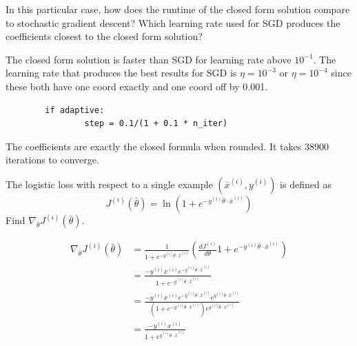 \documentclass[12pt, letterpaper]{article}
\begin{document}
\begin{subproblem}{}
    In this particular case, how does the runtime of the closed form solution compare to stochastic
gradient descent? Which learning rate used for SGD produces the coefficients closest to the closed form
solution?
\end{subproblem}
\begin{solution}
    The closed form solution is faster than SGD for learning rate above $10^{-1}$. The learning rate
    that produces the best results for SGD is $\eta = 10^{-3}$ or $\eta = 10^{-4}$ since these both have one coord exactly and one coord off by 0.001.
\end{solution}

\begin{subproblem}{}
    
\end{subproblem}
\begin{solution}
    \begin{verbatim}
        if adaptive:
                step = 0.1/(1 + 0.1 * n_iter)
    \end{verbatim}
    The coefficients are exactly the closed formula when rounded. It takes 38900 iterations to converge.
\end{solution}

\begin{subproblem}{}
    The logistic loss with respect to a single example $(\bar{x}^{(i)}, y^{(i)})$ is defined as
    \[J^{(i)}(\bar{\theta}) = \ln(1+e^{-y^{(i)}\bar{\theta}\cdot \bar{x}^{(i)}})\]
    Find $\nabla_{\bar{\theta}} J^{(i)}(\bar{\theta})$.
\end{subproblem}
\begin{solution}
    \begin{align*}
        \nabla_{\bar{\theta}} J^{(i)}(\bar{\theta}) &= \frac{1}{1+e^{-y^{(i)}\bar{\theta}\cdot \bar{x}^{(i)}}}\left( \frac{d J^{(i)}}{d \theta} 1+e^{-y^{(i)}\bar{\theta}\cdot \bar{x}^{(i)}} \right)\\
                                                    &= \frac{-y^{(i)}x^{(i)}e^{-y^{(i)}\bar{\theta}\cdot \bar{x}^{(i)}}}{1+e^{-y^{(i)}\bar{\theta}\cdot \bar{x}^{(i)}}}\\
                                                    &= \frac{-y^{(i)}x^{(i)}e^{-y^{(i)}\bar{\theta}\cdot \bar{x}^{(i)}} e^{y^{(i)}\bar{\theta}\cdot \bar{x}^{(i)}}}{\left( 1+e^{-y^{(i)}\bar{\theta}\cdot \bar{x}^{(i)}} \right) e^{y^{(i)}\bar{\theta}\cdot \bar{x}^{(i)}}}\\
                                                    &= \frac{-y^{(i)}x^{(i)}}{1+e^{y^{(i)}\bar{\theta}\cdot \bar{x}^{(i)}}}
    \end{align*}
\end{solution}
\end{document}
